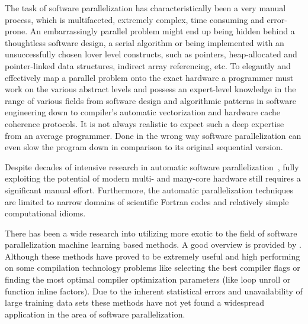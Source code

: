 \begin{description}[style=unboxed,leftmargin=0cm]
\item[Manual parallelization] The task of software parallelization has characteristically been a very manual process, which is multifaceted, extremely complex, time consuming and error-prone. An embarrassingly parallel problem might end up being hidden behind a thoughtless software design, a serial algorithm or being implemented with an unsuccessfully chosen lover level constructs, such as pointers, heap-allocated and pointer-linked data structures, indirect array referencing, etc. To elegantly and effectively map a parallel problem onto the exact hardware a programmer must work on the various abstract levels and possess an expert-level knowledge in the range of various fields from software design and algorithmic patterns in software engineering down to compiler's automatic vectorization and hardware cache coherence protocols. It is not always realistic to expect such a deep expertise from an average programmer. Done in the wrong way software parallelization can even slow the program down in comparison to its original sequential version. 
\item[Automatic parallelization] Despite decades of intensive research in automatic software parallelization~\cite{6813266}, fully exploiting the potential of modern multi- and many-core hardware still requires a significant manual effort. Furthermore, the automatic parallelization techniques are limited to narrow domains of scientific Fortran codes and relatively simple computational idioms.
\item[ML based parallelization] There has been a wide research into utilizing more exotic to the field of software parallelization machine learning based methods. A good overview is provided by \cite{ml-oboyle}. Although these methods have proved to be extremely useful and high performing on some compilation technology problems like selecting the best compiler flags or finding the most optimal compiler optimization parameters (like loop unroll or function inline factors). Due to the inherent statistical errors and unavailability of large training data sets these methods have not yet found a widespread application in the area of software parallelization. 
\end{description}
